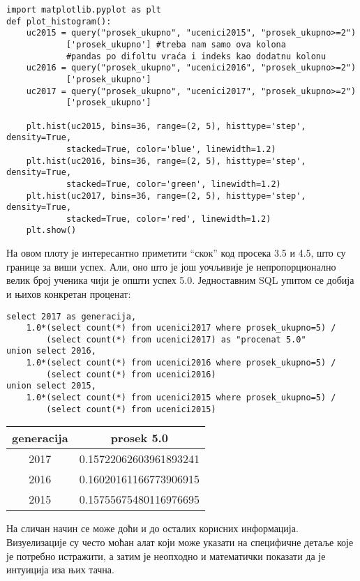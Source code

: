 \begin{verbatim}
import matplotlib.pyplot as plt
def plot_histogram():
    uc2015 = query("prosek_ukupno", "ucenici2015", "prosek_ukupno>=2")
            ['prosek_ukupno'] #treba nam samo ova kolona
            #pandas po difoltu vraća i indeks kao dodatnu kolonu
    uc2016 = query("prosek_ukupno", "ucenici2016", "prosek_ukupno>=2")
            ['prosek_ukupno']
    uc2017 = query("prosek_ukupno", "ucenici2017", "prosek_ukupno>=2")
            ['prosek_ukupno']

    plt.hist(uc2015, bins=36, range=(2, 5), histtype='step', density=True, 
            stacked=True, color='blue', linewidth=1.2)
    plt.hist(uc2016, bins=36, range=(2, 5), histtype='step', density=True, 
            stacked=True, color='green', linewidth=1.2)
    plt.hist(uc2017, bins=36, range=(2, 5), histtype='step', density=True, 
            stacked=True, color='red', linewidth=1.2)
    plt.show()
\end{verbatim}

На овом плоту је интересантно приметити \enquote{скок} код просека 3.5 и 4.5, што су границе за виши успех. Али, оно што је још уочљивије је непропорционално велик број ученика чији је општи успех 5.0. Једноставним SQL упитом се добија и њихов конкретан проценат:

\begin{verbatim}
select 2017 as generacija, 
    1.0*(select count(*) from ucenici2017 where prosek_ukupno=5) /
        (select count(*) from ucenici2017) as "procenat 5.0" 
union select 2016, 
    1.0*(select count(*) from ucenici2016 where prosek_ukupno=5) /
        (select count(*) from ucenici2016) 
union select 2015, 
    1.0*(select count(*) from ucenici2015 where prosek_ukupno=5) /
        (select count(*) from ucenici2015)
\end{verbatim}

\begin{tabular}{c|c}
generacija & prosek 5.0 \\ \hline
2017 & 0.15722062603961893241 \\
2016 & 0.16020161166773906915 \\
2015 & 0.15755675480116976695 \\
\end{tabular}

На сличан начин се може доћи и до осталих корисних информација. Визуелизације су често моћан алат који може указати на специфичне детаље које је потребно истражити, а затим је неопходно и математички показати да је интуиција иза њих тачна.